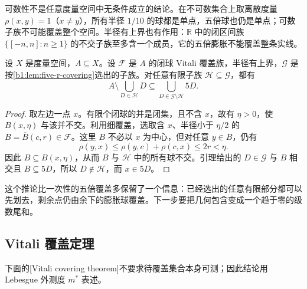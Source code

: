 可数性不是任意度量空间中无条件成立的结论。在不可数集合上取离散度量 \(\rho(x,y)=1\)（\(x\ne y\)），所有半径 \(1/10\) 的球都是单点，五倍球也仍是单点；可数子族不可能覆盖整个空间。半径有上界也有作用：\(\mathbb R\) 中的闭区间族 \(\{[-n,n]:n\geq1\}\) 的不交子族至多含一个成员，它的五倍膨胀不能覆盖整条实线。

\begin{corollary}
\label{b1:cor:five-r-tail-cover}
设 \(X\) 是度量空间，\(A\subseteq X\)。设 \(\mathcal F\) 是 \(A\) 的闭球 Vitali 覆盖族，半径有上界，\(\mathcal G\) 是按\cref{b1:lem:five-r-covering}选出的子族。对任意有限子族 \(\mathcal H\subseteq\mathcal G\)，都有
\[
A\setminus\bigcup_{D\in\mathcal H}D
\subseteq\bigcup_{D\in\mathcal G\setminus\mathcal H}5D.
\]
\end{corollary}
\begin{proof}
取左边一点 \(x\)。有限个闭球的并是闭集，且不含 \(x\)，故有 \(\eta>0\)，使 \(B(x,\eta)\) 与该并不交。利用细覆盖，选取含 \(x\)、半径小于 \(\eta/2\) 的
\(B=\overline B(c,r)\in\mathcal F\)。这里 \(B\) 不必以 \(x\) 为中心，但对任意 \(y\in B\)，仍有
\[
 \rho(y,x)\leq\rho(y,c)+\rho(c,x)\leq2r<\eta.
\]
因此 \(B\subseteq B(x,\eta)\)，从而 \(B\) 与 \(\mathcal H\) 中的所有球不交。引理给出的 \(D\in\mathcal G\) 与 \(B\) 相交且 \(B\subseteq5D\)，所以 \(D\notin\mathcal H\)，而 \(x\in5D\)。
\end{proof}

这个推论比一次性的五倍覆盖多保留了一个信息：已经选出的任意有限部分都可以先划去，剩余点仍由余下的膨胀球覆盖。下一步要把几何包含变成一个趋于零的级数尾和。

\subsection{Vitali 覆盖定理}
\label{b1:subsec:130103}

下面的[Vitali covering theorem]不要求待覆盖集合本身可测；因此结论用 Lebesgue 外测度 \(m^*\) 表述。

